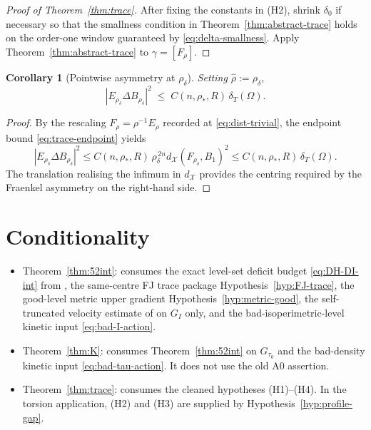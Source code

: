 \documentclass[11pt]{article}
\newtheorem{corollary}[theorem]{Corollary}
\theoremstyle{definition}
\newcommand{\Om}{\Omega}
\newcommand{\rstar}{\rho_{*}}
\newcommand{\rhad}{\widehat\rho}
\newcommand{\X}{\mathcal X}
\begin{document}
\begin{proof}[Proof of Theorem~\ref{thm:trace}]
After fixing the constants in (H2), shrink $\delta_0$ if necessary so
that the smallness condition in Theorem~\ref{thm:abstract-trace} holds
on the order-one window guaranteed by \eqref{eq:delta-smallness}.  Apply
Theorem~\ref{thm:abstract-trace} to $\gamma=[F_\rho]$.
\end{proof}

\begin{corollary}[Pointwise asymmetry at $\rho_\delta$]\label{cor:pointwise-asymmetry}
Setting $\rhad:=\rho_\delta$,
\[
   |E_{\rho_\delta}\Delta B_{\rho_\delta}|^2 \;\le\; C(n,\rstar,R)\,\delta_T(\Om).
\]
\end{corollary}

\begin{proof}
By the rescaling $F_\rho=\rho^{-1}E_\rho$ recorded at
\eqref{eq:dist-trivial}, the endpoint bound \eqref{eq:trace-endpoint}
yields
\[
   |E_{\rho_\delta}\Delta B_{\rho_\delta}|^2
   \le C(n,\rstar,R)\,\rho_\delta^{\,2n}
      d_\X(F_{\rho_\delta},B_1)^2
   \le C(n,\rstar,R)\,\delta_T(\Om).
\]
The translation realising the infimum in $d_\X$ provides the centring
required by the Fraenkel asymmetry on the right-hand side.
\end{proof}

\section{Conditionality}\label{sec:cond}

\begin{itemize}
\item Theorem~\ref{thm:52int}: consumes the exact level-set deficit
budget \eqref{eq:DH-DI-int} from \cite{LevelSetIdentity}, the
same-centre FJ trace package Hypothesis~\ref{hyp:FJ-trace}, the
good-level metric upper gradient Hypothesis~\ref{hyp:metric-good}, the
self-truncated velocity estimate of \cite{TrimmedVelocityRepair} on
$G_I$ only, and the bad-isoperimetric-level kinetic input
\eqref{eq:bad-I-action}.
\item Theorem~\ref{thm:K}: consumes Theorem~\ref{thm:52int} on
$G_{\tau_0}$ and the bad-density kinetic input
\eqref{eq:bad-tau-action}.  It does not use the old A0 assertion.
\item Theorem~\ref{thm:trace}: consumes the cleaned hypotheses
(H1)--(H4).  In the torsion application, (H2) and (H3) are supplied by
Hypothesis~\ref{hyp:profile-gap}.
\end{itemize}
\end{document}
